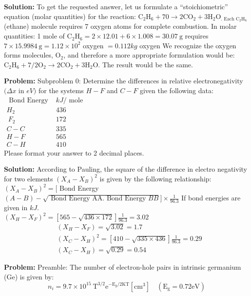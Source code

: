 \documentclass[10pt]{article}
\begin{document}
\textbf{Solution:}
To get the requested answer, let us formulate a ``stoichiometric'' equation (molar quantities) for the reaction: $\mathrm{C}_{2} \mathrm{H}_{6}+70 \rightarrow 2 \mathrm{CO}_{2}+3 \mathrm{H}_{2} \mathrm{O}_{\text {. Each } \mathrm{C}_{2} \mathrm{H}_{6}}$ (ethane) molecule requires 7 oxygen atoms for complete combustion. In molar quantities: 1 mole of $\mathrm{C}_{2} \mathrm{H}_{6}=2 \times 12.01+6 \times 1.008=30.07 \mathrm{~g}$ requires
$7 \times 15.9984 \mathrm{~g}=1.12 \times 10^{2}$ oxygen $=\boxed{0.112} kg$ oxygen
We recognize the oxygen forms molecules, $\mathrm{O}_{2}$, and therefore a more appropriate formulation would be: $\mathrm{C}_{2} \mathrm{H}_{6}+7 / 2 \mathrm{O}_{2} \rightarrow 2 \mathrm{CO}_{2}+3 \mathrm{H}_{2} \mathrm{O}$. The result would be the same.


\textbf{Problem:}
Subproblem 0: Determine the differences in relative electronegativity $(\Delta x$ in $e V)$ for the systems ${H}-{F}$ and ${C}-{F}$ given the following data:
$\begin{array}{cl}\text { Bond Energy } & {kJ} / \text { mole } \\ {H}_{2} & 436 \\ {~F}_{2} & 172 \\ {C}-{C} & 335 \\ {H}-{F} & 565 \\ {C}-{H} & 410\end{array}$
\\
Please format your answer to 2 decimal places. 


\textbf{Solution:}
According to Pauling, the square of the difference in electro negativity for two elements $\left(X_{A}-X_{B}\right)^{2}$ is given by the following relationship: $\left(X_{A}-X_{B}\right)^{2}=[$ Bond Energy $(A-B)-\sqrt{\text { Bond Energy AA. Bond Energy } B B}] \times \frac{1}{96.3}$
If bond energies are given in ${kJ}$.\\
$\left(X_{H}-X_{F}\right)^{2}=[565-\sqrt{436 \times 172}] \frac{1}{96.3}=3.02$
\[
\begin{aligned}
& \left({X}_{{H}}-{X}_{{F}}\right)=\sqrt{3.02}=1.7 \\
& \left(X_{C}-X_{H}\right)^{2}=[410-\sqrt{335 \times 436}] \frac{1}{96.3}=0.29 \\
& \left(X_{C}-X_{H}\right)=\sqrt{0.29}= \boxed{0.54}
\end{aligned}
\]


\textbf{Problem:}
Preamble: The number of electron-hole pairs in intrinsic germanium (Ge) is given by:
\[
n_{i}=9.7 \times 10^{15} \mathrm{~T}^{3 / 2} \mathrm{e}^{-\mathrm{E}_{g} / 2 \mathrm{KT}}\left[\mathrm{cm}^{3}\right] \quad\left(\mathrm{E}_{\mathrm{g}}=0.72 \mathrm{eV}\right)
\]
\end{document}
